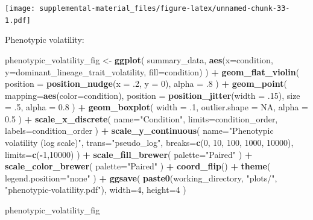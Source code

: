 \documentclass[]{book}
\newenvironment{Shaded}{\begin{snugshade}}{\end{snugshade}}
\newcommand{\DataTypeTok}[1]{\textcolor[rgb]{0.13,0.29,0.53}{#1}}
\newcommand{\DecValTok}[1]{\textcolor[rgb]{0.00,0.00,0.81}{#1}}
\newcommand{\FloatTok}[1]{\textcolor[rgb]{0.00,0.00,0.81}{#1}}
\newcommand{\KeywordTok}[1]{\textcolor[rgb]{0.13,0.29,0.53}{\textbf{#1}}}
\newcommand{\NormalTok}[1]{#1}
\newcommand{\OperatorTok}[1]{\textcolor[rgb]{0.81,0.36,0.00}{\textbf{#1}}}
\newcommand{\OtherTok}[1]{\textcolor[rgb]{0.56,0.35,0.01}{#1}}
\newcommand{\StringTok}[1]{\textcolor[rgb]{0.31,0.60,0.02}{#1}}
\begin{document}
\texttt{[image: supplemental-material\_files/figure-latex/unnamed-chunk-33-1.pdf]}

Phenotypic volatility:

\begin{Shaded}
\begin{Highlighting}[]
\NormalTok{phenotypic_volatility_fig <-}\StringTok{ }\KeywordTok{ggplot}\NormalTok{(}
\NormalTok{    summary_data,}
    \KeywordTok{aes}\NormalTok{(}\DataTypeTok{x=}\NormalTok{condition, }\DataTypeTok{y=}\NormalTok{dominant_lineage_trait_volatility, }\DataTypeTok{fill=}\NormalTok{condition)}
\NormalTok{  ) }\OperatorTok{+}
\StringTok{  }\KeywordTok{geom_flat_violin}\NormalTok{(}
    \DataTypeTok{position =} \KeywordTok{position_nudge}\NormalTok{(}\DataTypeTok{x =} \FloatTok{.2}\NormalTok{, }\DataTypeTok{y =} \DecValTok{0}\NormalTok{),}
    \DataTypeTok{alpha =} \FloatTok{.8}
\NormalTok{  ) }\OperatorTok{+}
\StringTok{  }\KeywordTok{geom_point}\NormalTok{(}
    \DataTypeTok{mapping=}\KeywordTok{aes}\NormalTok{(}\DataTypeTok{color=}\NormalTok{condition),}
    \DataTypeTok{position =} \KeywordTok{position_jitter}\NormalTok{(}\DataTypeTok{width =} \FloatTok{.15}\NormalTok{),}
    \DataTypeTok{size =} \FloatTok{.5}\NormalTok{,}
    \DataTypeTok{alpha =} \FloatTok{0.8}
\NormalTok{  ) }\OperatorTok{+}
\StringTok{  }\KeywordTok{geom_boxplot}\NormalTok{(}
    \DataTypeTok{width =} \FloatTok{.1}\NormalTok{,}
    \DataTypeTok{outlier.shape =} \OtherTok{NA}\NormalTok{,}
    \DataTypeTok{alpha =} \FloatTok{0.5}
\NormalTok{  ) }\OperatorTok{+}
\StringTok{  }\KeywordTok{scale_x_discrete}\NormalTok{(}
    \DataTypeTok{name=}\StringTok{"Condition"}\NormalTok{,}
    \DataTypeTok{limits=}\NormalTok{condition_order,}
    \DataTypeTok{labels=}\NormalTok{condition_order}
\NormalTok{  ) }\OperatorTok{+}
\StringTok{  }\KeywordTok{scale_y_continuous}\NormalTok{(}
    \DataTypeTok{name=}\StringTok{"Phenotypic volatility (log scale)"}\NormalTok{,}
    \DataTypeTok{trans=}\StringTok{"pseudo_log"}\NormalTok{,}
    \DataTypeTok{breaks=}\KeywordTok{c}\NormalTok{(}\DecValTok{0}\NormalTok{, }\DecValTok{10}\NormalTok{, }\DecValTok{100}\NormalTok{, }\DecValTok{1000}\NormalTok{, }\DecValTok{10000}\NormalTok{),}
    \DataTypeTok{limits=}\KeywordTok{c}\NormalTok{(}\OperatorTok{-}\DecValTok{1}\NormalTok{,}\DecValTok{10000}\NormalTok{)}
\NormalTok{  ) }\OperatorTok{+}
\StringTok{  }\KeywordTok{scale_fill_brewer}\NormalTok{(}
    \DataTypeTok{palette=}\StringTok{"Paired"}
\NormalTok{  ) }\OperatorTok{+}
\StringTok{  }\KeywordTok{scale_color_brewer}\NormalTok{(}
    \DataTypeTok{palette=}\StringTok{"Paired"}
\NormalTok{  ) }\OperatorTok{+}
\StringTok{  }\KeywordTok{coord_flip}\NormalTok{() }\OperatorTok{+}
\StringTok{  }\KeywordTok{theme}\NormalTok{(}
    \DataTypeTok{legend.position=}\StringTok{"none"}
\NormalTok{  ) }\OperatorTok{+}
\StringTok{  }\KeywordTok{ggsave}\NormalTok{(}
    \KeywordTok{paste0}\NormalTok{(working_directory, }\StringTok{"plots/"}\NormalTok{, }\StringTok{"phenotypic-volatility.pdf"}\NormalTok{),}
    \DataTypeTok{width=}\DecValTok{4}\NormalTok{,}
    \DataTypeTok{height=}\DecValTok{4}
\NormalTok{  )}

\NormalTok{phenotypic_volatility_fig}
\end{Highlighting}
\end{Shaded}
\end{document}
